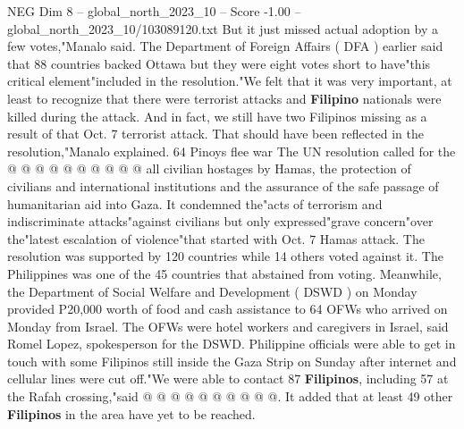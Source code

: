 \begin{textsample}{NEG Dim 8 – global\_north\_2023\_10 – Score -1.00 – global\_north\_2023\_10/103089120.txt}
But it just missed actual adoption by a few votes,"Manalo said.
The Department of Foreign Affairs ( DFA ) earlier said that 88 countries backed Ottawa but they were eight votes short to have"this critical element"included in the resolution."We felt that it was very important, at least to recognize that there were terrorist attacks and \textbf{Filipino} nationals were killed during the attack.
And in fact, we still have two Filipinos missing as a result of that Oct. 7 terrorist attack.
That should have been reflected in the resolution,"Manalo explained. 64 Pinoys flee war The UN resolution called for the @ @ @ @ @ @ @ @ @ @ all civilian hostages by Hamas, the protection of civilians and international institutions and the assurance of the safe passage of humanitarian aid into Gaza.
It condemned the"acts of terrorism and indiscriminate attacks"against civilians but only expressed"grave concern"over the"latest escalation of violence"that started with Oct. 7 Hamas attack.
The resolution was supported by 120 countries while 14 others voted against it.
The Philippines was one of the 45 countries that abstained from voting.
Meanwhile, the Department of Social Welfare and Development ( DSWD ) on Monday provided P20,000 worth of food and cash assistance to 64 OFWs who arrived on Monday from Israel.
The OFWs were hotel workers and caregivers in Israel, said Romel Lopez, spokesperson for the DSWD.
Philippine officials were able to get in touch with some Filipinos still inside the Gaza Strip on Sunday after internet and cellular lines were cut off."We were able to contact 87 \textbf{Filipinos}, including 57 at the Rafah crossing,"said @ @ @ @ @ @ @ @ @ @.
It added that at least 49 other \textbf{Filipinos} in the area have yet to be reached.

\end{textsample}
